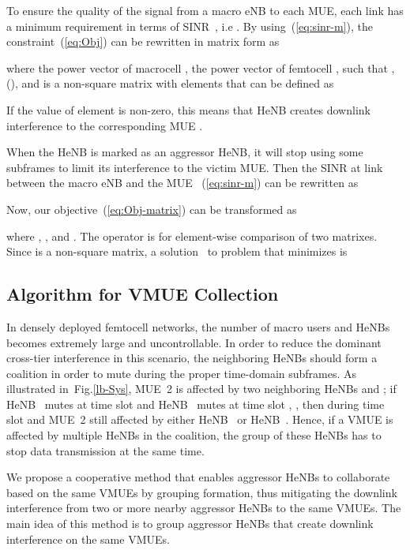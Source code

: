 \documentclass[paper]{ieice}
\begin{document}
To ensure the quality of the signal from a macro eNB to each MUE, each link  has a minimum requirement in terms of SINR~\cite{Kwon2009}, i.e . By using~(\ref{eq:sinr-m}), the constraint~(\ref{eq:Obj}) can be rewritten in matrix form as
  
 where the power vector of macrocell , the power vector of femtocell ,  such that , (), and  is a non-square matrix with  elements that can be defined as


If the value of element  is non-zero, this means that HeNB  creates downlink interference to the corresponding MUE .

When the HeNB is marked as an aggressor HeNB, it will stop using some subframes to limit its interference to the victim MUE. Then the SINR  at link  between the  macro eNB and the MUE ~(\ref{eq:sinr-m}) can be rewritten as
 

Now, our objective~(\ref{eq:Obj-matrix}) can be transformed as

where , , and . The operator  is for element-wise comparison of two matrixes. Since  is a non-square matrix, a solution~\cite{chong2013} to problem  that minimizes  is


\subsection{Algorithm for VMUE Collection}
\label{Femto-Collect}
In densely deployed femtocell networks, the number of macro users and HeNBs becomes extremely large and uncontrollable. In order to reduce the dominant cross-tier interference in this scenario, the neighboring HeNBs should form a coalition in order to mute during the proper time-domain subframes. As illustrated in~Fig.\ref{lb-Sys}, MUE~2 is affected by two neighboring HeNBs  and ; if HeNB~ mutes at time slot  and HeNB~ mutes at time slot , , then during time slot  and  MUE~2 still affected by either HeNB~ or HeNB~. Hence, if a VMUE is affected by multiple HeNBs in the coalition, the group of these HeNBs has to stop data transmission at the same time.

We propose a cooperative method that enables aggressor HeNBs to collaborate based on the same VMUEs by grouping formation, thus mitigating the downlink interference from two or more nearby aggressor HeNBs to the same VMUEs. The main idea of this method is to group aggressor HeNBs that create downlink interference on the same VMUEs.
\end{document}
